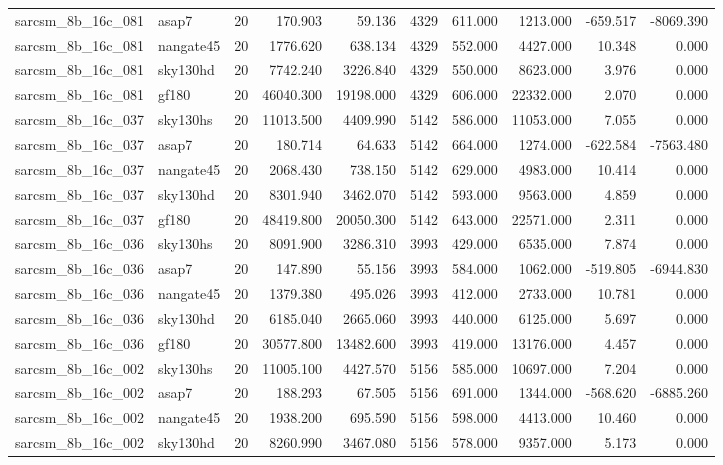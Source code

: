 \begin{longtable}{llrrrrrrrr}
sarcsm\_8b\_16c\_081 & asap7 & 20 & 170.903 & 59.136 & 4329 & 611.000 & 1213.000 & -659.517 & -8069.390 \\
sarcsm\_8b\_16c\_081 & nangate45 & 20 & 1776.620 & 638.134 & 4329 & 552.000 & 4427.000 & 10.348 & 0.000 \\
sarcsm\_8b\_16c\_081 & sky130hd & 20 & 7742.240 & 3226.840 & 4329 & 550.000 & 8623.000 & 3.976 & 0.000 \\
sarcsm\_8b\_16c\_081 & gf180 & 20 & 46040.300 & 19198.000 & 4329 & 606.000 & 22332.000 & 2.070 & 0.000 \\
sarcsm\_8b\_16c\_037 & sky130hs & 20 & 11013.500 & 4409.990 & 5142 & 586.000 & 11053.000 & 7.055 & 0.000 \\
sarcsm\_8b\_16c\_037 & asap7 & 20 & 180.714 & 64.633 & 5142 & 664.000 & 1274.000 & -622.584 & -7563.480 \\
sarcsm\_8b\_16c\_037 & nangate45 & 20 & 2068.430 & 738.150 & 5142 & 629.000 & 4983.000 & 10.414 & 0.000 \\
sarcsm\_8b\_16c\_037 & sky130hd & 20 & 8301.940 & 3462.070 & 5142 & 593.000 & 9563.000 & 4.859 & 0.000 \\
sarcsm\_8b\_16c\_037 & gf180 & 20 & 48419.800 & 20050.300 & 5142 & 643.000 & 22571.000 & 2.311 & 0.000 \\
sarcsm\_8b\_16c\_036 & sky130hs & 20 & 8091.900 & 3286.310 & 3993 & 429.000 & 6535.000 & 7.874 & 0.000 \\
sarcsm\_8b\_16c\_036 & asap7 & 20 & 147.890 & 55.156 & 3993 & 584.000 & 1062.000 & -519.805 & -6944.830 \\
sarcsm\_8b\_16c\_036 & nangate45 & 20 & 1379.380 & 495.026 & 3993 & 412.000 & 2733.000 & 10.781 & 0.000 \\
sarcsm\_8b\_16c\_036 & sky130hd & 20 & 6185.040 & 2665.060 & 3993 & 440.000 & 6125.000 & 5.697 & 0.000 \\
sarcsm\_8b\_16c\_036 & gf180 & 20 & 30577.800 & 13482.600 & 3993 & 419.000 & 13176.000 & 4.457 & 0.000 \\
sarcsm\_8b\_16c\_002 & sky130hs & 20 & 11005.100 & 4427.570 & 5156 & 585.000 & 10697.000 & 7.204 & 0.000 \\
sarcsm\_8b\_16c\_002 & asap7 & 20 & 188.293 & 67.505 & 5156 & 691.000 & 1344.000 & -568.620 & -6885.260 \\
sarcsm\_8b\_16c\_002 & nangate45 & 20 & 1938.200 & 695.590 & 5156 & 598.000 & 4413.000 & 10.460 & 0.000 \\
sarcsm\_8b\_16c\_002 & sky130hd & 20 & 8260.990 & 3467.080 & 5156 & 578.000 & 9357.000 & 5.173 & 0.000 \\

\end{longtable}
